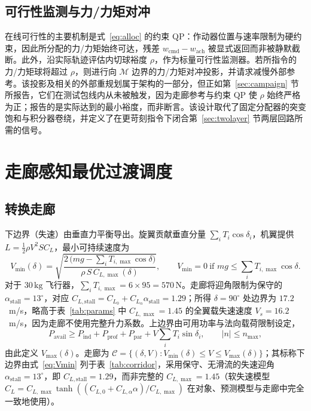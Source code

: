 \documentclass[UTF8,a4paper,11pt]{ctexart}
\newcommand{\SI}[2]{\ensuremath{#1\,#2}}
\newcommand{\kilogram}{\mathrm{kg}}
\newcommand{\newton}{\mathrm{N}}
\begin{document}
\subsection{可行性监测与力/力矩对冲}\label{sec:hedge}
在线可行性的主要机制是式~\eqref{eq:alloc} 的约束 QP：作动器位置与速率限制为硬约束，因此所分配的力/力矩始终可达，残差 $w_{\mathrm{cmd}}-w_{\mathrm{ach}}$ 被显式返回而非被静默截断。此外，沿实际轨迹评估内切球裕度 $\rho$，作为标量可行性监测器。若所指令的力/力矩球将超过 $\rho$，则进行向 $\mathcal{M}$ 边界的力/力矩对冲投影，并请求减慢外部参考。该投影及相关的外部重规划属于架构的一部分，但正如第~\ref{sec:campaign} 节所报告，它们在测试包线内从未被触发，因为走廊参考与约束 QP 使 $\rho$ 始终严格为正；报告的是实际达到的最小裕度，而非断言。该设计取代了固定分配器的突变饱和与积分器卷绕，并定义了在更苛刻指令下闭合第~\ref{sec:twolayer} 节两层回路所需的信号。

\section{走廊感知最优过渡调度}\label{sec:corridor}

\subsection{转换走廊}\label{sec:corridorderiv}
下边界（失速）由垂直力平衡导出。旋翼贡献垂直分量 $\sum_i T_i\cos\delta_i$，机翼提供 $L=\tfrac12\rho V^2 S C_L$，最小可持续速度为
\begin{equation}
V_{\min}(\delta)=
\sqrt{\frac{2\,\bigl(mg-\sum_i T_{i,\max}\cos\delta\bigr)}
{\rho\,S\,C_{L,\max}(\delta)}},
\qquad V_{\min}=0\ \text{if }mg\le\sum_i T_{i,\max}\cos\delta .
\label{eq:Vmin}
\end{equation}
对于 \SI{30}{\kilogram} 飞行器，$\sum_i T_{i,\max}=6\times95=\SI{570}{\newton}$。走廊将迎角限制为保守的 $\alpha_{\mathrm{stall}}=13^\circ$，对应 $C_{L,\mathrm{stall}}=C_{L_0}+C_{L_\alpha}\alpha_{\mathrm{stall}}=1.29$；所得 $\delta=90^\circ$ 处边界为 $17.2$~m/s，略高于表~\ref{tab:params} 中 $C_{L,\max}=1.45$ 的全翼载失速速度 $V_s=16.2$~m/s，因为走廊不使用完整升力系数。上边界由可用功率与法向载荷限制设定，
\begin{equation}
P_{\mathrm{avail}}\ge P_{\mathrm{ind}}+P_{\mathrm{prof}}+P_{\mathrm{par}}
 +V\!\sum_i T_i\sin\delta_i,\qquad |n|\le n_{\max},
\label{eq:Vmax}
\end{equation}
由此定义 $V_{\max}(\delta)$。走廊为 $\mathcal{C}=\{(\delta,V):V_{\min}(\delta)\le V\le V_{\max}(\delta)\}$；其标称下边界由式~\eqref{eq:Vmin} 列于表~\ref{tab:corridor}，采用保守、无滑流的失速迎角 $\alpha_{\mathrm{stall}}=13^\circ$，即 $C_{L,\mathrm{stall}}=1.29$，而非完整的 $C_{L,\max}=1.45$（软失速模型 $C_L=C_{L,\max}\tanh((C_{L,0}+C_{L,\alpha}\alpha)/C_{L,\max})$ 在对象、预测模型与走廊中完全一致地使用）。
\end{document}
